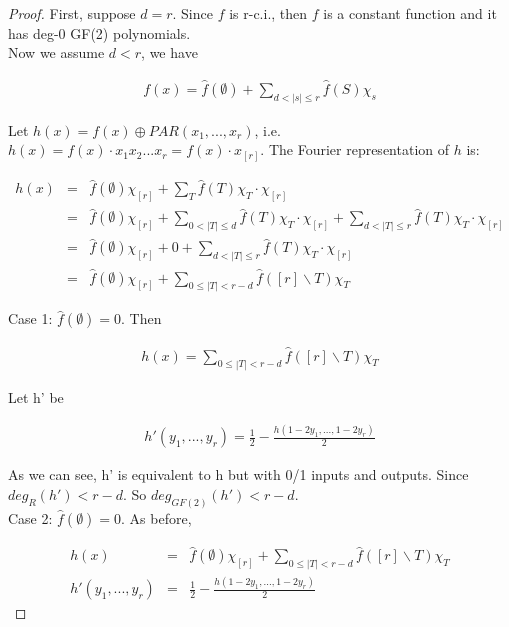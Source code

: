 \documentclass[12pt]{article}
\begin{document}
\begin{proof}
First, suppose $d = r$. Since $f$ is r-c.i., then $f$ is a constant
function and it has deg-0 GF(2) polynomials. \\

Now we assume $d < r$, we have

\begin{eqnarray*}
f(x) = \hat {f}(\emptyset) + \sum_{d < |s| \le r} {\hat {f}(S)\chi_s}
\end{eqnarray*}

Let $h(x) = f(x) \oplus PAR(x_1,...,x_r)$, i.e. $h(x) = f(x) \cdot
x_1x_2...x_r = f(x) \cdot x_{[r]}$. The Fourier representation of $h$
is:

\begin{eqnarray*}
h(x) 
&=& \hat {f}(\emptyset) \chi_{[r]} + \sum_T {\hat {f}(T) \chi_T
  \cdot \chi_{[r]}} \\
&=& \hat {f}(\emptyset) \chi_{[r]} + \sum_{0 < |T| \le d} {\hat
  {f}(T) \chi_T \cdot \chi_{[r]}} + \sum_{d < |T| \le r} {\hat
  {f}(T) \chi_T \cdot \chi_{[r]}} \\
&=& \hat {f}(\emptyset) \chi_{[r]} + 0 + \sum_{d < |T| \le r}
{\hat {f}(T) \chi_T \cdot \chi_{[r]}} \\
&=& \hat {f}(\emptyset) \chi_{[r]} + \sum_{0 \le |T| < r-d} {\hat
  {f}([r] \backslash T) \chi_T}
\end{eqnarray*}

Case 1: $\hat {f}(\emptyset) = 0$. Then

\begin{eqnarray*}
h(x) = \sum_{0 \le |T| < r-d} {\hat {f}([r] \backslash T) \chi_T}
\end{eqnarray*}

Let h' be 

\begin{eqnarray*}
h'(y_1,...,y_r) = \frac {1}{2} - \frac {h(1 - 2y_1, ..., 1 - 2y_r)}{2}
\end{eqnarray*}

As we can see, h' is equivalent to h but with 0/1 inputs and
outputs. Since $deg_R(h') < r-d$. So $deg_{GF(2)}(h') < r-d$. \\

Case 2: $\hat {f}(\emptyset) = 0$. As before,

\begin{eqnarray*}
h(x) &=& \hat {f}(\emptyset) \chi_{[r]} + \sum_{0 \le |T| < r-d} {\hat
  {f}([r] \backslash T) \chi_T} \\
h'(y_1,...,y_r) &=& \frac {1}{2} - \frac {h(1 - 2y_1, ..., 1 -
  2y_r)}{2}
\end{eqnarray*}


\end{proof}
\end{document}
